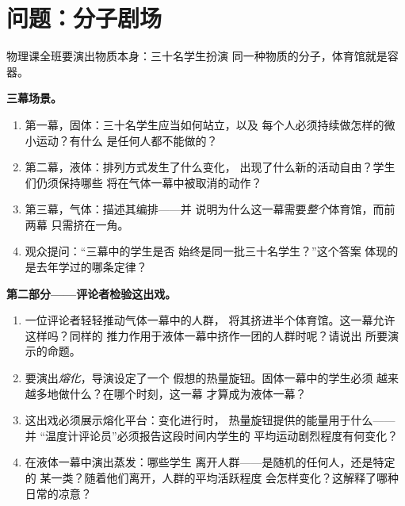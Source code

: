 \section{问题：分子剧场}

\begin{problem}\label{pb:g7:states-of-matter:1}
物理课全班要演出物质本身：三十名学生扮演
同一种物质的分子，体育馆就是容器。

\medskip\noindent\textbf{三幕场景。}
\begin{enumerate}
  \item 第一幕，固体：三十名学生应当如何站立，以及
        每个人必须持续做怎样的微小运动？有什么
        是任何人都不能做的？
  \item 第二幕，液体：排列方式发生了什么变化，
        出现了什么新的活动自由？学生们仍须保持哪些
        将在气体一幕中被取消的动作？
  \item 第三幕，气体：描述其编排——并
        说明为什么这一幕需要\emph{整个}体育馆，而前两幕
        只需挤在一角。
  \item 观众提问：“三幕中的学生是否
        始终是同一批三十名学生？”这个答案
        体现的是去年学过的哪条定律？
\end{enumerate}

\medskip\noindent\textbf{第二部分——评论者检验这出戏。}
\begin{enumerate}[resume]
  \item 一位评论者轻轻推动气体一幕中的人群，
        将其挤进半个体育馆。这一幕允许这样吗？同样的
        推力作用于液体一幕中挤作一团的人群时呢？请说出
        所要演示的命题。
  \item 要演出\emph{熔化}，导演设定了一个
        假想的热量旋钮。固体一幕中的学生必须
        越来越多地做什么？在哪个时刻，这一幕
        才算成为液体一幕？
  \item 这出戏必须展示熔化平台：变化进行时，
        热量旋钮提供的能量用于什么——并
        “温度计评论员”必须报告这段时间内学生的
        平均运动剧烈程度有何变化？
  \item 在液体一幕中演出蒸发：哪些学生
        离开人群——是随机的任何人，还是特定的
        某一类？随着他们离开，人群的平均活跃程度
        会怎样变化？这解释了哪种日常的凉意？
\end{enumerate}


\end{problem}
